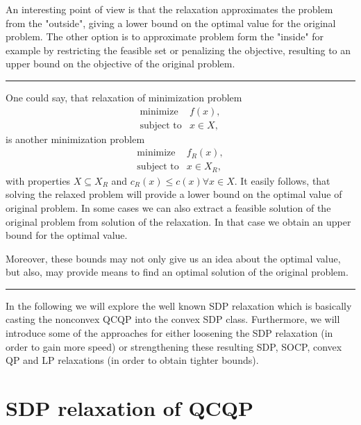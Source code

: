 \documentclass[12pt]{book}
\theoremstyle{definition}
\begin{document}
An interesting point of view is that the relaxation approximates the problem from the "outside", 
giving a lower bound on the optimal value for the original problem. The other option is to approximate problem form the "inside" for example by restricting the feasible set or penalizing the objective, resulting to an upper bound on the objective of the original problem. %

\bigskip
\hrule
\bigskip

One could say, that relaxation of minimization problem 
\begin{equation}
\begin{array}{ll}
\mbox{minimize} & f(x), \\
\mbox{subject to} & x\in X,
\end{array}
\end{equation}
is another minimization problem  
\begin{equation}
\begin{array}{ll}
\mbox{minimize} & f_R(x), \\
\mbox{subject to} & x\in X_R,
\end{array}
\end{equation}
with properties $X\subseteq X_R$ and $c_R(x)\leq c(x) \forall x\in X$.
It easily follows, that solving the relaxed problem will provide a lower bound on the optimal value of original problem. In some cases we can also extract a feasible solution of the original problem from solution of the relaxation. In that case we obtain an upper bound for the optimal value. 

Moreover, these bounds may not only give us an idea about the optimal value, but also, may provide means to find an optimal solution of the original problem. 


\bigskip
\hrule
\bigskip


In the following we will explore the well known SDP  relaxation which is basically casting the nonconvex QCQP into the convex SDP class.
Furthermore, we will introduce some of the approaches for either loosening the SDP relaxation (in order to gain more speed) or strengthening these resulting SDP, SOCP, convex QP and LP relaxations (in order to obtain tighter bounds).



\section{SDP relaxation of QCQP}
\label{SectionSDPRelax}
\end{document}

